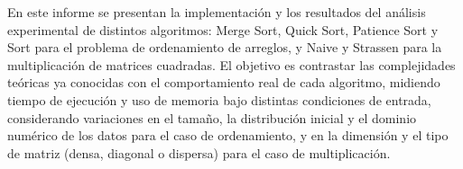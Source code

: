 

En este informe se presentan la implementación y los resultados del análisis experimental de distintos algoritmos: Merge Sort, Quick Sort, Patience Sort y Sort para el problema de ordenamiento de arreglos, y Naive y Strassen para la multiplicación de matrices cuadradas. El objetivo es contrastar las complejidades teóricas ya conocidas con el comportamiento real de cada algoritmo, midiendo tiempo de ejecución y uso de memoria bajo distintas condiciones de entrada, considerando variaciones en el tamaño, la distribución inicial y el dominio numérico de los datos para el caso de ordenamiento, y en la dimensión y el tipo de matriz (densa, diagonal o dispersa) para el caso de multiplicación.
